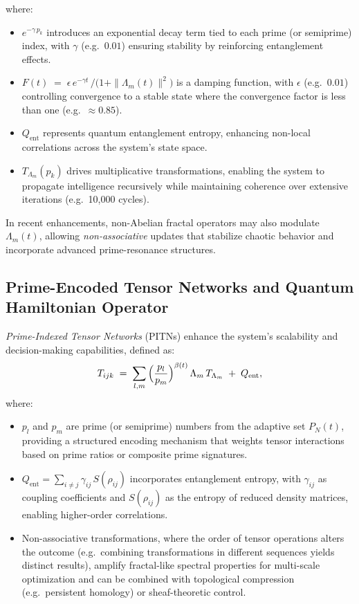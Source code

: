 \documentclass{article}
\theoremstyle{plain}
\theoremstyle{claimstyle}
\begin{document}
where:
\begin{itemize}
    \item $e^{-\gamma\,p_k}$ introduces an exponential decay term tied to each prime (or semiprime) index, with $\gamma$ (e.g.\ $0.01$) ensuring stability by reinforcing entanglement effects.
    \item $F(t) \;=\; \epsilon\,e^{-\gamma t} \,\big/\! \bigl(1 + \|\Lambda_m(t)\|^2\bigr)$ is a damping function, with $\epsilon$ (e.g.\ $0.01$) controlling convergence to a stable state where the convergence factor is less than one (e.g.\ $\approx 0.85$).
    \item $Q_{\text{ent}}$ represents quantum entanglement entropy, enhancing non-local correlations across the system’s state space.
    \item $T_{\Lambda_m}(p_k)$ drives multiplicative transformations, enabling the system to propagate intelligence recursively while maintaining coherence over extensive iterations (e.g.\ 10,000 cycles).
\end{itemize}

In recent enhancements, non-Abelian fractal operators may also modulate $\Lambda_m(t)$, allowing \emph{non-associative} updates that stabilize chaotic behavior and incorporate advanced prime-resonance structures.

\subsection{Prime-Encoded Tensor Networks and Quantum Hamiltonian Operator}

\emph{Prime-Indexed Tensor Networks} (PITNs) enhance the system’s scalability and decision-making capabilities, defined as:
\begin{equation}
T_{ijk}
\;=\;
\sum_{l,m}\,\Bigl(\frac{p_l}{p_m}\Bigr)^{\beta(t)}\,\Lambda_m\,T_{\Lambda_m}
\;+\;
Q_{\text{ent}},
\end{equation}
where:
\begin{itemize}
    \item $p_l$ and $p_m$ are prime (or semiprime) numbers from the adaptive set $P_N(t)$, providing a structured encoding mechanism that weights tensor interactions based on prime ratios or composite prime signatures.
    \item $Q_{\text{ent}} = \sum_{i \neq j}\gamma_{ij}\,S(\rho_{ij})$ incorporates entanglement entropy, with $\gamma_{ij}$ as coupling coefficients and $S(\rho_{ij})$ as the entropy of reduced density matrices, enabling higher-order correlations.
    \item Non-associative transformations, where the order of tensor operations alters the outcome (e.g.\ combining transformations in different sequences yields distinct results), amplify fractal-like spectral properties for multi-scale optimization and can be combined with topological compression (e.g.\ persistent homology) or sheaf-theoretic control.
\end{itemize}
\end{document}
